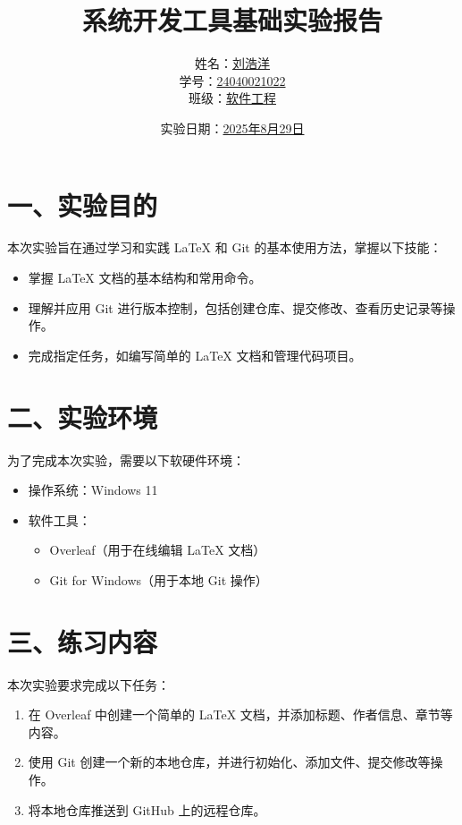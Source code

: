 \documentclass[a4paper, 12pt]{article}
\begin{document}
\title{\huge{系统开发工具基础实验报告}}
\author{姓名：\underline{刘浩洋} \\ 
        学号：\underline{24040021022} \\ 
        班级：\underline{软件工程}}
\date{实验日期：\underline{2025年8月29日}}
\maketitle

\section*{一、实验目的}
本次实验旨在通过学习和实践 LaTeX 和 Git 的基本使用方法，掌握以下技能：
\begin{itemize}
    \item 掌握 LaTeX 文档的基本结构和常用命令。
    \item 理解并应用 Git 进行版本控制，包括创建仓库、提交修改、查看历史记录等操作。
    \item 完成指定任务，如编写简单的 LaTeX 文档和管理代码项目。
\end{itemize}

\section*{二、实验环境}
为了完成本次实验，需要以下软硬件环境：
\begin{itemize}
    \item 操作系统：Windows 11
    \item 软件工具：
    \begin{itemize}
        \item Overleaf（用于在线编辑 LaTeX 文档）
        \item Git for Windows（用于本地 Git 操作）
    \end{itemize}
\end{itemize}

\section*{三、练习内容}
本次实验要求完成以下任务：
\begin{enumerate}
    \item 在 Overleaf 中创建一个简单的 LaTeX 文档，并添加标题、作者信息、章节等内容。
    \item 使用 Git 创建一个新的本地仓库，并进行初始化、添加文件、提交修改等操作。
    \item 将本地仓库推送到 GitHub 上的远程仓库。
\end{enumerate}
\end{document}
